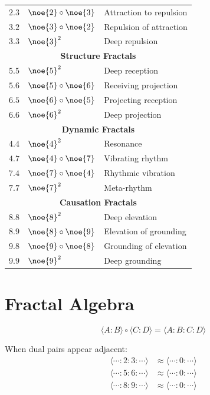 \begin{longtable}{lll}
$2.3$ & $\noe{2} \circ \noe{3}$ & Attraction to repulsion \\
$3.2$ & $\noe{3} \circ \noe{2}$ & Repulsion of attraction \\
$3.3$ & $\noe{3}^2$ & Deep repulsion \\
\midrule
\multicolumn{3}{c}{\textbf{Structure Fractals}} \\
\midrule
$5.5$ & $\noe{5}^2$ & Deep reception \\
$5.6$ & $\noe{5} \circ \noe{6}$ & Receiving projection \\
$6.5$ & $\noe{6} \circ \noe{5}$ & Projecting reception \\
$6.6$ & $\noe{6}^2$ & Deep projection \\
\midrule
\multicolumn{3}{c}{\textbf{Dynamic Fractals}} \\
\midrule
$4.4$ & $\noe{4}^2$ & Resonance \\
$4.7$ & $\noe{4} \circ \noe{7}$ & Vibrating rhythm \\
$7.4$ & $\noe{7} \circ \noe{4}$ & Rhythmic vibration \\
$7.7$ & $\noe{7}^2$ & Meta-rhythm \\
\midrule
\multicolumn{3}{c}{\textbf{Causation Fractals}} \\
\midrule
$8.8$ & $\noe{8}^2$ & Deep elevation \\
$8.9$ & $\noe{8} \circ \noe{9}$ & Elevation of grounding \\
$9.8$ & $\noe{9} \circ \noe{8}$ & Grounding of elevation \\
$9.9$ & $\noe{9}^2$ & Deep grounding \\
\bottomrule
\end{longtable}

\section{Fractal Algebra}

\begin{definition}
\label{def:fractal-comp}
\[
\langle A : B \rangle \circ \langle C : D \rangle = \langle A : B : C : D \rangle
\]
\end{definition}

\begin{definition}
\label{def:fractal-simp}
When dual pairs appear adjacent:
\begin{align}
\langle \cdots : 2 : 3 : \cdots \rangle &\approx \langle \cdots : 0 : \cdots \rangle \\
\langle \cdots : 5 : 6 : \cdots \rangle &\approx \langle \cdots : 0 : \cdots \rangle \\
\langle \cdots : 8 : 9 : \cdots \rangle &\approx \langle \cdots : 0 : \cdots \rangle
\end{align}
\end{definition}

